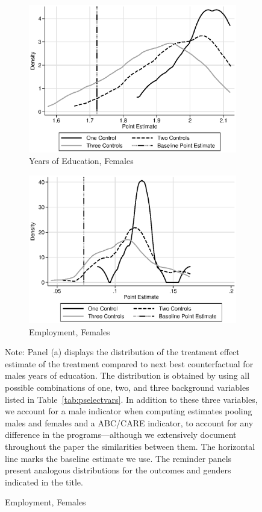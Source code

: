 \begin{figure}
\begin{subfigure}[h]{0.4\textwidth}
\end{subfigure}
\begin{subfigure}[h]{0.4\textwidth}
		\centering
		\caption{Years of Education, Females}
		\includegraphics[width=\textwidth]{output/sencontrols_female_years_30y_itt_wctrl.eps}
\end{subfigure}%
\begin{subfigure}[h]{0.4\textwidth}
	\centering
	\caption{Employment, Females}
		\includegraphics[width=\textwidth]{output/sencontrols_female_si30y_works_itt_wctrl.eps}
\end{subfigure}
\footnotesize \justify
Note: Panel (a) displays the distribution of the treatment effect estimate of the treatment compared to next best counterfactual for males years of education. The distribution is obtained by using all possible combinations of one, two, and three background variables listed in Table~\ref{tab:pselectvars}. In addition to these three variables, we account for a male indicator when computing estimates pooling males and females and a ABC/CARE indicator, to account for any difference in the programs---although we extensively document throughout the paper the similarities between them. The horizontal line marks the baseline estimate we use. The reminder panels present analogous distributions for the outcomes and genders indicated in the title.\\
\end{figure}

